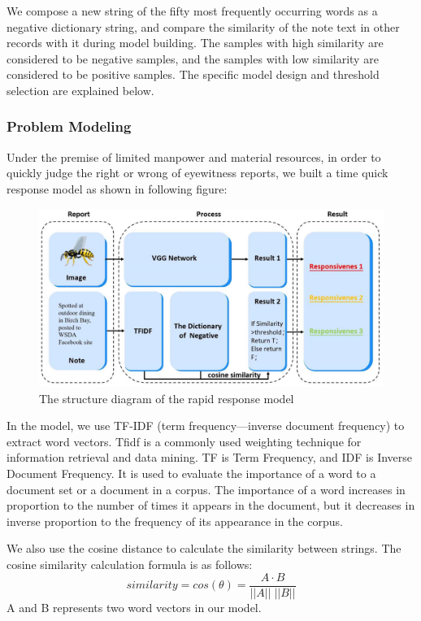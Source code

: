 \documentclass{mcmthesis}
\begin{document}
We compose a new string of the fifty most frequently occurring words as a negative dictionary string, and compare the similarity of the note text in other records with it during model building. The samples with high similarity are considered to be negative samples, and the samples with low similarity are considered to be positive samples. The specific model design and threshold selection are explained below.

\subsubsection{Problem Modeling}
Under the premise of limited manpower and material resources, in order to quickly judge the right or wrong of eyewitness reports, we built a time quick response model as shown in following figure:

\begin{figure}[H]
	\centering
	\includegraphics[width=\textwidth]{screenshot017}
	\caption{The structure diagram of the rapid response model}
	\label{fig:screenshot017}
\end{figure}

In the model, we use TF-IDF (term frequency—inverse document frequency) to extract word vectors. Tfidf is a commonly used weighting technique for information retrieval and data mining. TF is Term Frequency, and IDF is Inverse Document Frequency. It is used to evaluate the importance of a word to a document set or a document in a corpus. The importance of a word increases in proportion to the number of times it appears in the document, but it decreases in inverse proportion to the frequency of its appearance in the corpus.

We also use the cosine distance to calculate the similarity between strings. The cosine similarity calculation formula is as follows:
\begin{equation}
	similarity=cos(\theta)=\frac{A\cdot B}{||A||\;||B||}
\end{equation}
A and B represents two word vectors in our model.
\end{document}
